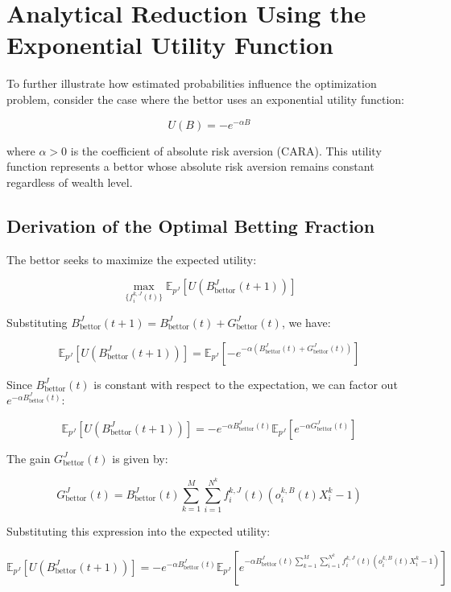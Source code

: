 \chapter{Analytical Reduction Using the Exponential Utility Function}
\label{appendix:analytical_reduction_using_exp_expected_utility}

To further illustrate how estimated probabilities influence the optimization problem, consider the case where the bettor uses an exponential utility function:

\[
U(B) = -e^{-\alpha B}
\]

where \( \alpha > 0 \) is the coefficient of absolute risk aversion (CARA). This utility function represents a bettor whose absolute risk aversion remains constant regardless of wealth level.

\section{Derivation of the Optimal Betting Fraction}

The bettor seeks to maximize the expected utility:

\[
\max_{\{ f_i^{k,J}(t) \}} \mathbb{E}_{p^{J}}\left[ U\left( B_{\text{bettor}}^J(t+1) \right) \right]
\]

Substituting \( B_{\text{bettor}}^J(t+1) = B_{\text{bettor}}^J(t) + G_{\text{bettor}}^J(t) \), we have:

\[
\mathbb{E}_{p^{J}}\left[ U\left( B_{\text{bettor}}^J(t+1) \right) \right] = \mathbb{E}_{p^{J}}\left[ -e^{ -\alpha \left( B_{\text{bettor}}^J(t) + G_{\text{bettor}}^J(t) \right) } \right]
\]

Since \( B_{\text{bettor}}^J(t) \) is constant with respect to the expectation, we can factor out \( e^{ -\alpha B_{\text{bettor}}^J(t) } \):

\[
\mathbb{E}_{p^{J}}\left[ U\left( B_{\text{bettor}}^J(t+1) \right) \right] = -e^{ -\alpha B_{\text{bettor}}^J(t) } \mathbb{E}_{p^{J}}\left[ e^{ -\alpha G_{\text{bettor}}^J(t) } \right]
\]

The gain \( G_{\text{bettor}}^J(t) \) is given by:

\[
G_{\text{bettor}}^J(t) = B_{\text{bettor}}^J(t) \sum_{k=1}^M \sum_{i=1}^{N^k} f_i^{k,J}(t) \left( o_i^{k,B}(t) X_i^k - 1 \right)
\]

Substituting this expression into the expected utility:

\[
\mathbb{E}_{p^{J}}\left[ U\left( B_{\text{bettor}}^J(t+1) \right) \right] = -e^{ -\alpha B_{\text{bettor}}^J(t) } \mathbb{E}_{p^{J}}\left[ e^{ -\alpha B_{\text{bettor}}^J(t) \sum_{k=1}^M \sum_{i=1}^{N^k} f_i^{k,J}(t) \left( o_i^{k,B}(t) X_i^k - 1 \right) } \right]
\]

